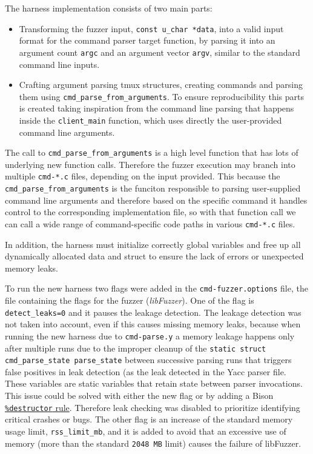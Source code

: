 The harness implementation consists of two main parts:
\begin{itemize}
    \item Transforming the fuzzer input, \texttt{const u\_char *data}, into a valid input format for the command parser target function, by parsing it into an argument count \texttt{argc} and an argument vector \texttt{argv}, similar to the standard command line inputs.
    \item Crafting argument parsing tmux structures, creating commands and parsing them using \texttt{cmd\_parse\_from\_arguments}. To ensure reproducibility this parts is created taking inspiration from the command line parsing that happens inside the \texttt{client\_main} function, which uses directly the user-provided command line arguments.

\end{itemize}
The call to \texttt{cmd\_parse\_from\_arguments} is a high level function that has lots of underlying new function calls. Therefore the fuzzer execution may branch into multiple \texttt{cmd-*.c} files, depending on the input provided. This because the \texttt{cmd\_parse\_from\_arguments} is the funciton responsible to parsing user-supplied command line arguments and therefore based on the specific command it handles control to the corresponding implementation file, so with that function call we can call a wide range of command-specific code paths in various \texttt{cmd-*.c} files.

In addition, the harness must initialize correctly global variables and free up all dynamically allocated data and struct to ensure the lack of errors or unexpected memory leaks.

To run the new harness two flags were added in the \texttt{cmd-fuzzer.options} file, the file containing the flags for the fuzzer (\textit{libFuzzer}). One of the flag is \texttt{detect\_leaks=0} and it pauses the leakage detection. The leakage detection was not taken into account, even if this causes missing memory leaks, because when running the new harness due to \texttt{cmd-parse.y} a memory leakage happens only after multiple runs due to the improper cleanup of the \texttt{static struct cmd\_parse\_state parse\_state} between successive parsing runs that triggers false positives in leak detection (as the leak detected in the Yacc parser file. These variables are static variables that retain state between parser invocations. This issue could be solved with either the new flag or by adding a Bison \href{https://www.gnu.org/software/bison/manual/html_node/Destructor-Decl.html}{\texttt{\%destructor} rule}.
Therefore leak checking was disabled to prioritize identifying critical crashes or bugs.
The other flag is an increase of the standard memory usage limit, \texttt{rss\_limit\_mb}, and it is added to avoid that an excessive use of memory (more than the standard \texttt{2048 MB} limit) causes the failure of libFuzzer.


